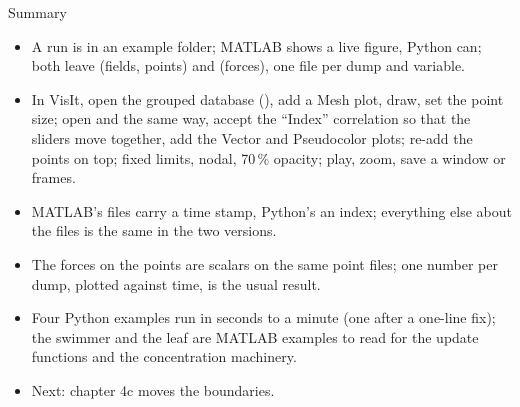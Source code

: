 \documentclass[aspectratio=169,11pt]{beamer}
\begin{document}
\begin{frame}{Summary}
\label{fr:summary}
\small
\begin{itemize}
  \item A run is  in an example folder; MATLAB shows a live figure, Python can; both leave  (fields, points) and  (forces), one file per dump and variable.
  \item In VisIt, open the grouped database (), add a Mesh plot, draw, set the point size; open  and  the same way, accept the ``Index'' correlation so that the sliders move together, add the Vector and Pseudocolor plots; re-add the points on top; fixed limits, nodal, 70\,\% opacity; play, zoom, save a window or frames.
  \item MATLAB's files carry a time stamp, Python's an index; everything else about the files is the same in the two versions.
  \item The forces on the points are scalars on the same point files; one number per dump, plotted against time, is the usual result.
  \item Four Python examples run in seconds to a minute (one after a one-line fix); the swimmer and the leaf are MATLAB examples to read for the update functions and the concentration machinery.
  \item Next: chapter 4c moves the boundaries.
\end{itemize}
\end{frame}
\end{document}
